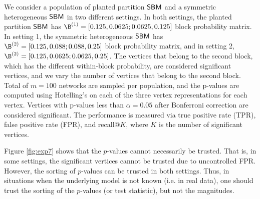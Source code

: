 We consider a population of planted partition $\operatorname{\mathsf{SBM}}$ and a symmetric heterogeneous $\operatorname{\mathsf{SBM}}$ in two different settings. In both settings, the planted partition $\operatorname{\mathsf{SBM}}$ has $\B^{(1)} = [0.125, 0.0625; 0.0625, 0.125]$ block probability matrix. In setting 1, the symmetric heterogeneous $\operatorname{\mathsf{SBM}}$ has  $\B^{(2)} = [0.125, 0.088; 0.088, 0.25]$ block probability matrix, and in setting 2, $\B^{(2)} = [0.125,  0.0625; 0.0625, 0.25]$. The vertices that belong to the second block, which has the different within-block probability, are considered significant vertices, and we vary the number of vertices that belong to the second block. Total of $m=100$ networks are sampled per population, and the p-values are computed using Hotelling's on each of the three vertex representations for each vertex. Vertices with p-values less than $\alpha=0.05$ after Bonferroni correction are considered significant. The performance is measured via true positive rate (TPR), false positive rate (FPR), and recall@$K$, where $K$ is the number of significant vertices. 

Figure \ref{fig:exp7} shows that the $p$-values cannot necessarily be trusted. That is, in some settings, the significant vertices cannot be trusted due to uncontrolled FPR. However, the sorting of $p$-values can be trusted in both settings. Thus, in situations when the underlying model is not known (i.e. in real data), one should trust the sorting of the $p$-values (or test statistic), but not the magnitudes. 


